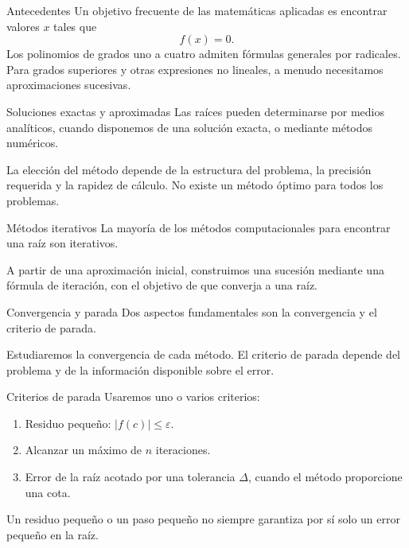 \documentclass[original_version/main.tex]{subfiles}
\begin{document}
\graphicspath{{imagenes/tema7/}{../imagenes/tema7/}}



\begin{frame}{Antecedentes}
Un objetivo frecuente de las matemáticas aplicadas es encontrar valores $x$ tales que\[f(x)=0.\]Los polinomios de grados uno a cuatro admiten fórmulas generales por radicales. Para grados superiores y otras expresiones no lineales, a menudo necesitamos aproximaciones sucesivas.
\end{frame}

\begin{frame}{Soluciones exactas y aproximadas}
Las raíces pueden determinarse por medios analíticos, cuando disponemos de una solución exacta, o mediante métodos numéricos.\par\medskip La elección del método depende de la estructura del problema, la precisión requerida y la rapidez de cálculo. No existe un método óptimo para todos los problemas.
\end{frame}

\begin{frame}{Métodos iterativos}
La mayoría de los métodos computacionales para encontrar una raíz son iterativos.\par\medskip A partir de una aproximación inicial, construimos una sucesión mediante una fórmula de iteración, con el objetivo de que converja a una raíz.
\end{frame}

\begin{frame}{Convergencia y parada}
Dos aspectos fundamentales son la convergencia y el criterio de parada.\par\medskip Estudiaremos la convergencia de cada método. El criterio de parada depende del problema y de la información disponible sobre el error.
\end{frame}

\begin{frame}{Criterios de parada}
Usaremos uno o varios criterios:\begin{enumerate}\item Residuo pequeño: $|f(c)|\le\varepsilon$.\item Alcanzar un máximo de $n$ iteraciones.\item Error de la raíz acotado por una tolerancia $\Delta$, cuando el método proporcione una cota.\end{enumerate}Un residuo pequeño o un paso pequeño no siempre garantiza por sí solo un error pequeño en la raíz.
\end{frame}
\end{document}
